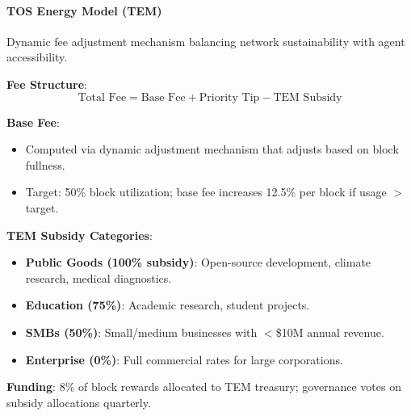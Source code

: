\documentclass[11pt]{article}
\begin{document}
\paragraph{TOS Energy Model (TEM)}
Dynamic fee adjustment mechanism balancing network sustainability with agent accessibility.

\textbf{Fee Structure}:
\begin{equation}
\text{Total Fee} = \text{Base Fee} + \text{Priority Tip} - \text{TEM Subsidy}
\end{equation}

\textbf{Base Fee}:
\begin{itemize}[noitemsep]
  \item Computed via dynamic adjustment mechanism that adjusts based on block fullness.
  \item Target: 50\% block utilization; base fee increases 12.5\% per block if usage $>$ target.
\end{itemize}

\textbf{TEM Subsidy Categories}:
\begin{itemize}[noitemsep]
  \item \textbf{Public Goods (100\% subsidy)}: Open-source development, climate research, medical diagnostics.
  \item \textbf{Education (75\%)}: Academic research, student projects.
  \item \textbf{SMBs (50\%)}: Small/medium businesses with $<$\$10M annual revenue.
  \item \textbf{Enterprise (0\%)}: Full commercial rates for large corporations.
\end{itemize}

\textbf{Funding}: 8\% of block rewards allocated to TEM treasury; governance votes on subsidy allocations quarterly.
\end{document}
